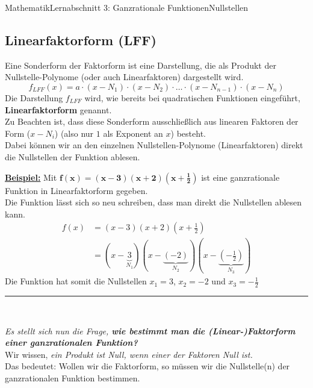\documentclass[11pt,twocolumn,oneside,openany,headings=optiontotoc,11pt,numbers=noenddot]{article}
\begin{document}
\begin{worksheet}{Mathematik}{Lernabschnitt 3: Ganzrationale Funktionen}{Nullstellen}
		\subsection*{Linearfaktorform (LFF)}
		Eine Sonderform der Faktorform ist eine Darstellung, die als Produkt der \grq{}Nullstelle-Polynome\grq{} (oder auch Linearfaktoren) dargestellt wird.
		\[f_{LFF}(x) = a\cdot{}(x-N_1)\cdot{}(x-N_2)\cdot{}\ldots{}\cdot{}(x-N_{n-1})\cdot{}(x-N_n)\]
		Die Darstellung \(f_{LFF}\) wird, wie bereits bei quadratischen Funktionen eingeführt, \textbf{Linearfaktorform} genannt.\\
		Zu Beachten ist, dass diese Sonderform ausschließlich aus linearen Faktoren der Form (\(x-N_i\)) (also nur \(1\) als Exponent an \(x\)) besteht.\\
		Dabei können wir an den einzelnen \grq{}Nullstellen-Polynome\grq{} (Linearfaktoren) direkt die Nullstellen der Funktion ablesen.\\
		\par\noindent
		\textbf{\underline{Beispiel:}} Mit \(\mathbf{f(x) = (x-3)(x+2)(x+\frac{1}{2})}\) ist eine ganzrationale Funktion in Linearfaktorform gegeben.\\
		Die Funktion lässt sich so \grq{}neu schreiben\grq{}, dass man direkt die Nullstellen ablesen kann.
		\begin{align*}
			f(x) & = (x-3)(x+2)(x+\frac{1}{2})\\  & = (x-\underbrace{3}_{N_1})(x-\underbrace{(-2)}_{N_2})(x-\underbrace{(-\frac{1}{2})}_{N_3})
		\end{align*}
		Die Funktion hat somit die Nullstellen \colorbox{green!10}{\(x_1=3\)}, \colorbox{green!10}{\(x_2 = -2\)} und \colorbox{green!10}{\(x_3 = -\frac{1}{2}\)}
		\par\noindent
		\rule{0.48\textwidth}{0.1pt}\\
		\par\noindent
		\textit{Es stellt sich nun die Frage, \textbf{wie bestimmt man die (Linear-)Faktorform einer ganzrationalen Funktion?}}\\
		Wir wissen, \textit{ein Produkt ist Null, wenn einer der Faktoren Null ist.}\\
		Das bedeutet: Wollen wir die Faktorform, so müssen wir die Nullstelle(n) der ganzrationalen Funktion bestimmen.

\end{worksheet}
\end{document}

